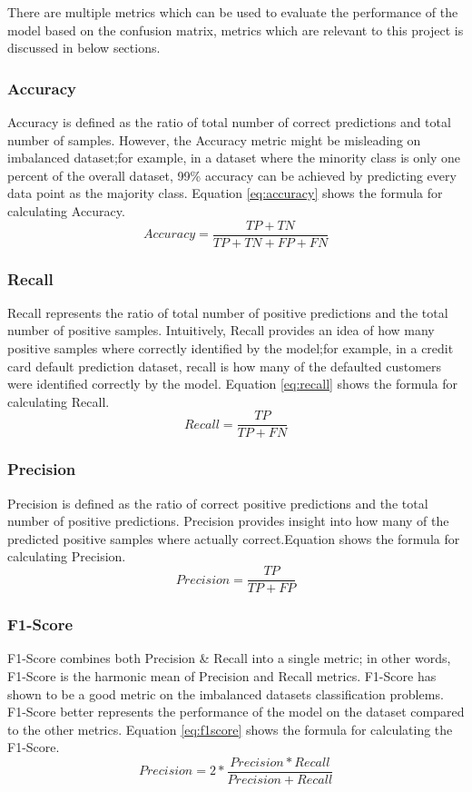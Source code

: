 \documentclass[twoside,11pt,a4paper]{article}
\begin{document}
There are multiple metrics which can be used to evaluate the performance of the model based on the confusion matrix, metrics which are relevant to this project is discussed in below sections.
\subsubsection{Accuracy}
Accuracy is defined as the ratio of total number of correct predictions and total number of samples. However, the Accuracy metric might be misleading on imbalanced dataset;for example, in a dataset where the minority class is only one percent of the overall dataset, 99\% accuracy can be achieved by predicting every data point as the majority class. Equation \ref{eq:accuracy} shows the formula for calculating Accuracy.
\begin{equation} \label{eq:accuracy}
	Accuracy = \frac{TP+TN}{TP+TN+FP+FN}
\end{equation}
\subsubsection{Recall}
Recall represents the ratio of total number of positive predictions and the total number of positive samples. Intuitively, Recall provides an idea of how many positive samples where correctly identified by the model;for example, in a credit card default prediction dataset, recall is how many of the defaulted customers were identified correctly by the model. Equation \ref{eq:recall} shows the formula for calculating Recall.
\begin{equation}\label{eq:recall}
	Recall = \frac{TP}{TP+FN}
\end{equation}
\subsubsection{Precision}
Precision is defined as the ratio of correct positive predictions and the total number of positive predictions. Precision provides insight into how many of the predicted positive samples where actually correct.Equation \label{eq:precision} shows the formula for calculating Precision.
\begin{equation}\label{eq:precision}
	Precision = \frac{TP}{TP+FP}
\end{equation}

\subsubsection{F1-Score}
F1-Score combines both Precision \& Recall into a single metric; in other words, F1-Score is the harmonic mean of Precision and Recall metrics. F1-Score has shown to be a good metric on the imbalanced datasets classification problems. F1-Score better represents the performance of the model on the dataset compared to the other metrics. Equation \ref{eq:f1score} shows the formula for calculating the F1-Score.
\begin{equation}\label{eq:f1score}
	Precision = 2 * \frac{Precision*Recall}{Precision + Recall}
\end{equation}
\end{document}
